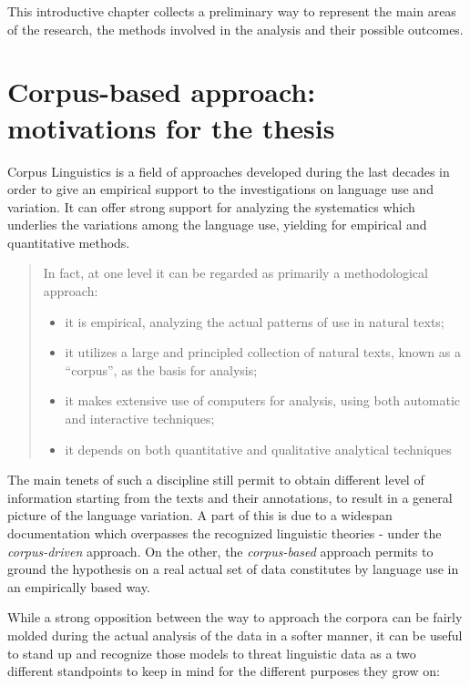 \documentclass[
  a4paper,
  twoside,
  12pt,
  chapterprefix=false,
  bibliography=totocnumbered,
  listof=flat]{scrbook}
\providecommand{\tightlist}{%
  \setlength{\itemsep}{0pt}\setlength{\parskip}{0pt}}
\begin{document}
This introductive chapter collects a preliminary way to represent the main areas of the research, the methods involved in the analysis and their possible outcomes.

\hypertarget{corpus-based-approach-motivations-for-the-thesis}{%
\section{Corpus-based approach: motivations for the thesis}\label{corpus-based-approach-motivations-for-the-thesis}}

Corpus Linguistics is a field of approaches developed during the last decades in order to give an empirical support to the investigations on language use and variation. It can offer strong support for analyzing the systematics which underlies the variations among the language use, yielding for empirical and quantitative methods.

\begin{quote}
In fact, at one level it can be regarded as primarily a methodological approach:

\begin{itemize}
\tightlist
\item
  it is empirical, analyzing the actual patterns of use in natural texts;
\item
  it utilizes a large and principled collection of natural texts, known as a ``corpus'', as the basis for analysis;
\item
  it makes extensive use of computers for analysis, using both automatic and interactive techniques;
\item
  it depends on both quantitative and qualitative analytical techniques
  \citep{biber1998}
\end{itemize}
\end{quote}

The main tenets of such a discipline still permit to obtain different level of information starting from the texts and their annotations, to result in a general picture of the language variation. A part of this is due to a widespan documentation which overpasses the recognized linguistic theories - under the \emph{corpus-driven} approach.
On the other, the \emph{corpus-based} approach permits to ground the hypothesis on a real actual set of data constitutes by language use in an empirically based way.

While a strong opposition between the way to approach the corpora can be fairly molded during the actual analysis of the data in a softer manner, it can be useful to stand up and recognize those models to threat linguistic data as a two different standpoints to keep in mind for the different purposes they grow on:
\end{document}
